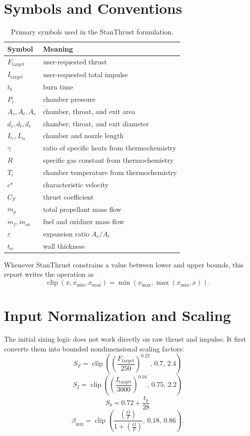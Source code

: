 \documentclass[11pt]{article}
\newcommand{\clip}{\operatorname{clip}}
\newcommand{\mdotp}{\dot{m}_{p}}
\newcommand{\mdotf}{\dot{m}_{f}}
\newcommand{\mdoto}{\dot{m}_{ox}}
\newcommand{\OF}{\left(\frac{O}{F}\right)}
\begin{document}
\section{Symbols and Conventions}
\begin{table}[H]
\centering
\caption{Primary symbols used in the StanThrust formulation.}
\begin{tabular}{ll}
\toprule
Symbol & Meaning \\
\midrule
$F_{\text{target}}$ & user-requested thrust \\
$I_{\text{target}}$ & user-requested total impulse \\
$t_b$ & burn time \\
$P_c$ & chamber pressure \\
$A_c, A_t, A_e$ & chamber, throat, and exit area \\
$d_c, d_t, d_e$ & chamber, throat, and exit diameter \\
$L_c, L_n$ & chamber and nozzle length \\
$\gamma$ & ratio of specific heats from thermochemistry \\
$R$ & specific gas constant from thermochemistry \\
$T_c$ & chamber temperature from thermochemistry \\
$c^\star$ & characteristic velocity \\
$C_F$ & thrust coefficient \\
$\mdotp$ & total propellant mass flow \\
$\mdotf, \mdoto$ & fuel and oxidizer mass flow \\
$\varepsilon$ & expansion ratio $A_e/A_t$ \\
$t_w$ & wall thickness \\
\bottomrule
\end{tabular}
\end{table}

Whenever StanThrust constrains a value between lower and upper bounds, this report writes the operation as
\[
\clip(x,x_{\min},x_{\max})=\min\!\left(x_{\max},\max(x_{\min},x)\right).
\]

\section{Input Normalization and Scaling}
The initial sizing logic does not work directly on raw thrust and impulse. It first converts them into bounded nondimensional scaling factors:
\begin{equation}
S_F=\clip\!\left(\left(\frac{F_{\text{target}}}{250}\right)^{0.22},\,0.7,\,2.4\right)
\label{eq:thrust-scale}
\end{equation}
\begin{equation}
S_I=\clip\!\left(\left(\frac{I_{\text{target}}}{3000}\right)^{0.16},\,0.75,\,2.2\right)
\label{eq:impulse-scale}
\end{equation}
\begin{equation}
S_b=0.72+\frac{t_b}{28}
\label{eq:burn-factor}
\end{equation}
\begin{equation}
\beta_{\text{mix}}=\clip\!\left(\frac{\OF}{1+\OF},\,0.18,\,0.86\right).
\label{eq:mix-bias}
\end{equation}
\end{document}
